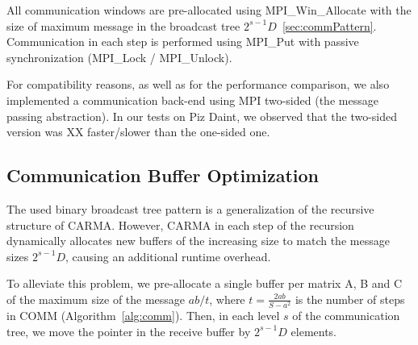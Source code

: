 \documentclass[sigplan,review,anonymous,10pt]{acmart}\settopmatter{printfolios=true,printccs=false,printacmref=false}
\begin{document}
All communication windows are 
pre-allocated using \linebreak MPI\_Win\_Allocate with the size of maximum 
message in the 
broadcast tree $2^{s-1} D$~\cref{sec:commPattern}. Communication in each 
step is performed using MPI\_Put with passive synchronization (MPI\_Lock / 
MPI\_Unlock).

For compatibility reasons, as well as for the performance comparison, we also 
implemented a communication back-end using MPI two-sided (the message passing 
abstraction). In our tests on Piz Daint, we observed that the two-sided version 
was XX faster/slower than the one-sided one.


\subsection{Communication Buffer Optimization}
\label{sec:bufferReuse}
The used binary broadcast tree pattern is a generalization 
of 
the recursive structure of CARMA. However, CARMA in each step of the 
recursion dynamically allocates new buffers of the increasing size to match the 
message sizes $2^{s-1} D$, causing an additional runtime overhead.

To alleviate this problem, we pre-allocate a 
single buffer per matrix A, B and C of the maximum size of the message $ab/t$, 
where $t = \frac{2ab}{S - a^2}$ is the number of steps in COMM 
(Algorithm~\ref{alg:comm}). Then, in each level $s$ of the communication tree, 
we  move the pointer in the receive buffer by $2^{s-1} D$ elements.
\end{document}
